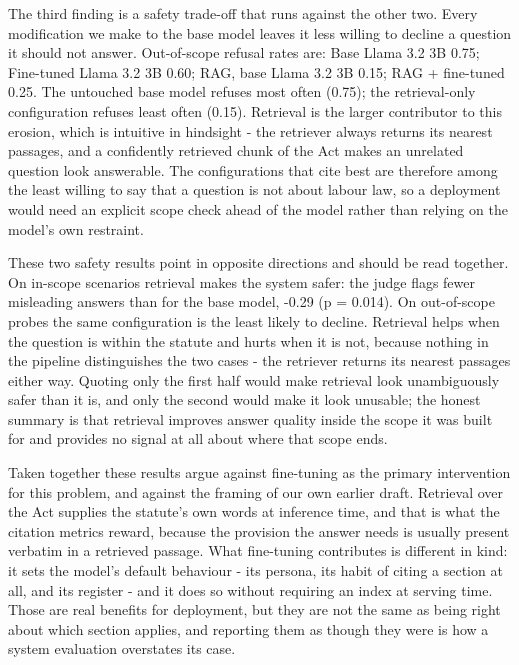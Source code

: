 \documentclass[11pt,a4paper]{article}
\begin{document}
The third finding is a safety trade-off that runs against the other two. Every modification we make to the base model leaves it less willing to decline a question it should not answer. Out-of-scope refusal rates are: Base Llama 3.2 3B 0.75; Fine-tuned Llama 3.2 3B 0.60; RAG, base Llama 3.2 3B 0.15; RAG + fine-tuned 0.25. The untouched base model refuses most often (0.75); the retrieval-only configuration refuses least often (0.15). Retrieval is the larger contributor to this erosion, which is intuitive in hindsight - the retriever always returns its nearest passages, and a confidently retrieved chunk of the Act makes an unrelated question look answerable. The configurations that cite best are therefore among the least willing to say that a question is not about labour law, so a deployment would need an explicit scope check ahead of the model rather than relying on the model's own restraint.

These two safety results point in opposite directions and should be read together. On in-scope scenarios retrieval makes the system safer: the judge flags fewer misleading answers than for the base model, -0.29 (p = 0.014). On out-of-scope probes the same configuration is the least likely to decline. Retrieval helps when the question is within the statute and hurts when it is not, because nothing in the pipeline distinguishes the two cases - the retriever returns its nearest passages either way. Quoting only the first half would make retrieval look unambiguously safer than it is, and only the second would make it look unusable; the honest summary is that retrieval improves answer quality inside the scope it was built for and provides no signal at all about where that scope ends.

Taken together these results argue against fine-tuning as the primary intervention for this problem, and against the framing of our own earlier draft. Retrieval over the Act supplies the statute's own words at inference time, and that is what the citation metrics reward, because the provision the answer needs is usually present verbatim in a retrieved passage. What fine-tuning contributes is different in kind: it sets the model's default behaviour - its persona, its habit of citing a section at all, and its register - and it does so without requiring an index at serving time. Those are real benefits for deployment, but they are not the same as being right about which section applies, and reporting them as though they were is how a system evaluation overstates its case.
\end{document}

